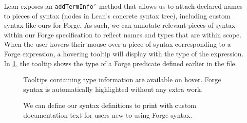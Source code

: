 Lean exposes an \texttt{addTermInfo'} method that allows us to attach declared names to pieces of syntax (nodes in Lean's concrete syntax tree), including custom syntax like ours for Forge. As such, we can annotate relevant pieces of syntax within our Forge specification to reflect names and types that are within scope. When the user hovers their mouse over a piece of syntax corresponding to a Forge expression, a hovering tooltip will display with the type of the expression. In \cref{fig:sc-highlighting-hover}, the tooltip shows the type of a Forge predicate defined earlier in the file. 

\begin{figure}
  \centering
  \caption{Tooltips containing type information are available on hover. Forge syntax is automatically highlighted without any extra work.}
  \label{fig:sc-highlighting-hover}
\end{figure}

\begin{figure}
  \begin{center}
  \end{center}
  \begin{center}
    \centering{}
  \end{center}
  \caption{We can define our syntax definitions to print with custom documentation text for users new to using Forge syntax. }
  \label{fig:sc-docstrings}
\end{figure}


